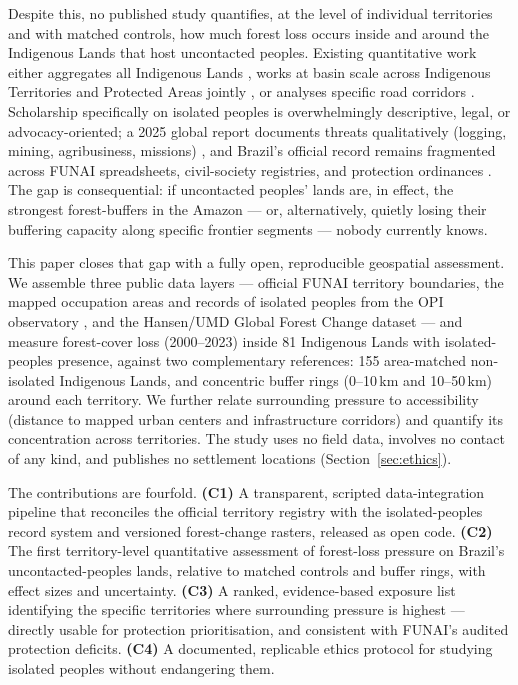 Despite this, no published study quantifies, at the level of individual territories and with matched controls, how much forest loss occurs inside and around the Indigenous Lands that host uncontacted peoples. Existing quantitative work either aggregates all Indigenous Lands \citep{nepstad2006,nolte2013}, works at basin scale across Indigenous Territories and Protected Areas jointly \citep{ritter2025}, or analyses specific road corridors \citep{ferrante2020}. Scholarship specifically on isolated peoples is overwhelmingly descriptive, legal, or advocacy-oriented; a 2025 global report documents threats qualitatively (logging, mining, agribusiness, missions) \citep{survival2025}, and Brazil's official record remains fragmented across FUNAI spreadsheets, civil-society registries, and protection ordinances \citep{funai_audit_2024,opi2025}. The gap is consequential: if uncontacted peoples' lands are, in effect, the strongest forest-buffers in the Amazon --- or, alternatively, quietly losing their buffering capacity along specific frontier segments --- nobody currently knows.

This paper closes that gap with a fully open, reproducible geospatial assessment. We assemble three public data layers --- official FUNAI territory boundaries, the mapped occupation areas and records of isolated peoples from the OPI observatory \citep{opi2025}, and the Hansen/UMD Global Forest Change dataset \citep{hansen2013,gfc_dataset} --- and measure forest-cover loss (2000--2023) inside 81 Indigenous Lands with isolated-peoples presence, against two complementary references: 155 area-matched non-isolated Indigenous Lands, and concentric buffer rings (0--10\,km and 10--50\,km) around each territory. We further relate surrounding pressure to accessibility (distance to mapped urban centers and infrastructure corridors) and quantify its concentration across territories. The study uses no field data, involves no contact of any kind, and publishes no settlement locations (Section~\ref{sec:ethics}).

The contributions are fourfold. \textbf{(C1)} A transparent, scripted data-integration pipeline that reconciles the official territory registry with the isolated-peoples record system and versioned forest-change rasters, released as open code. \textbf{(C2)} The first territory-level quantitative assessment of forest-loss pressure on Brazil's uncontacted-peoples lands, relative to matched controls and buffer rings, with effect sizes and uncertainty. \textbf{(C3)} A ranked, evidence-based exposure list identifying the specific territories where surrounding pressure is highest --- directly usable for protection prioritisation, and consistent with FUNAI's audited protection deficits. \textbf{(C4)} A documented, replicable ethics protocol for studying isolated peoples without endangering them.

